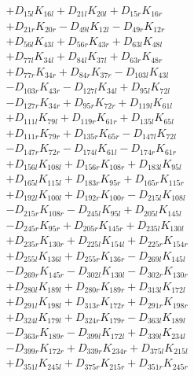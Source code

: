 \begin{multicols}{2}
\begin{align}
&+ D_{15l}K_{16l} + D_{21l}K_{20l} + D_{15r}K_{16r}  \nonumber \\
&+ D_{21r}K_{20r} - D_{49l}K_{12l} - D_{49r}K_{12r}  \nonumber \\
&+ D_{56l}K_{43l} + D_{56r}K_{43r} + D_{63l}K_{48l}  \nonumber \\
&+ D_{77l}K_{34l} + D_{84l}K_{37l} + D_{63r}K_{48r}  \nonumber \\
&+ D_{77r}K_{34r} + D_{84r}K_{37r} - D_{103l}K_{43l}  \nonumber \\
&- D_{103r}K_{43r} - D_{127l}K_{34l} + D_{95l}K_{72l}  \nonumber \\
&- D_{127r}K_{34r} + D_{95r}K_{72r} + D_{119l}K_{61l}  \nonumber \\
&+ D_{111l}K_{79l} + D_{119r}K_{61r} + D_{135l}K_{65l}  \nonumber \\
&+ D_{111r}K_{79r} + D_{135r}K_{65r} - D_{147l}K_{72l}  \nonumber \\
&- D_{147r}K_{72r} - D_{174l}K_{61l} - D_{174r}K_{61r}  \nonumber \\
&+ D_{156l}K_{108l} + D_{156r}K_{108r} + D_{183l}K_{95l}  \nonumber \\
&+ D_{165l}K_{115l} + D_{183r}K_{95r} + D_{165r}K_{115r}  \nonumber \\
&+ D_{192l}K_{100l} + D_{192r}K_{100r} - D_{215l}K_{108l}  \nonumber \\
&- D_{215r}K_{108r} - D_{245l}K_{95l} + D_{205l}K_{145l}  \nonumber \\
&- D_{245r}K_{95r} + D_{205r}K_{145r} + D_{235l}K_{130l}  \nonumber \\
&+ D_{235r}K_{130r} + D_{225l}K_{154l} + D_{225r}K_{154r}  \nonumber \\
&+ D_{255l}K_{136l} + D_{255r}K_{136r} - D_{269l}K_{145l}  \nonumber \\
&- D_{269r}K_{145r} - D_{302l}K_{130l} - D_{302r}K_{130r}  \nonumber \\
&+ D_{280l}K_{189l} + D_{280r}K_{189r} + D_{313l}K_{172l}  \nonumber \\
&+ D_{291l}K_{198l} + D_{313r}K_{172r} + D_{291r}K_{198r}  \nonumber \\
&+ D_{324l}K_{179l} + D_{324r}K_{179r} - D_{363l}K_{189l}  \nonumber \\
&- D_{363r}K_{189r} - D_{399l}K_{172l} + D_{339l}K_{234l}  \nonumber \\
&- D_{399r}K_{172r} + D_{339r}K_{234r} + D_{375l}K_{215l}  \nonumber \\
&+ D_{351l}K_{245l} + D_{375r}K_{215r} + D_{351r}K_{245r}  \nonumber \\

\end{align}
\end{multicols}
